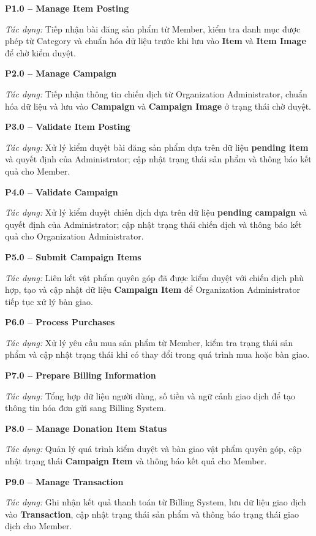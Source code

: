 \documentclass[12pt,a4paper]{report}
\begin{document}
\textbf{P1.0 -- Manage Item Posting}

\textit{Tác dụng:} Tiếp nhận bài đăng sản phẩm từ Member, kiểm tra danh mục được phép từ Category và chuẩn hóa dữ liệu trước khi lưu vào \textbf{Item} và \textbf{Item Image} để chờ kiểm duyệt.

\textbf{P2.0 -- Manage Campaign}

\textit{Tác dụng:} Tiếp nhận thông tin chiến dịch từ Organization Administrator, chuẩn hóa dữ liệu và lưu vào \textbf{Campaign} và \textbf{Campaign Image} ở trạng thái chờ duyệt.

\textbf{P3.0 -- Validate Item Posting}

\textit{Tác dụng:} Xử lý kiểm duyệt bài đăng sản phẩm dựa trên dữ liệu \textbf{pending item} và quyết định của Administrator; cập nhật trạng thái sản phẩm và thông báo kết quả cho Member.

\textbf{P4.0 -- Validate Campaign}

\textit{Tác dụng:} Xử lý kiểm duyệt chiến dịch dựa trên dữ liệu \textbf{pending campaign} và quyết định của Administrator; cập nhật trạng thái chiến dịch và thông báo kết quả cho Organization Administrator.

\textbf{P5.0 -- Submit Campaign Items}

\textit{Tác dụng:} Liên kết vật phẩm quyên góp đã được kiểm duyệt với chiến dịch phù hợp, tạo và cập nhật dữ liệu \textbf{Campaign Item} để Organization Administrator tiếp tục xử lý bàn giao.

\textbf{P6.0 -- Process Purchases}

\textit{Tác dụng:} Xử lý yêu cầu mua sản phẩm từ Member, kiểm tra trạng thái sản phẩm và cập nhật trạng thái khi có thay đổi trong quá trình mua hoặc bàn giao.

\textbf{P7.0 -- Prepare Billing Information}

\textit{Tác dụng:} Tổng hợp dữ liệu người dùng, số tiền và ngữ cảnh giao dịch để tạo thông tin hóa đơn gửi sang Billing System.

\textbf{P8.0 -- Manage Donation Item Status}

\textit{Tác dụng:} Quản lý quá trình kiểm duyệt và bàn giao vật phẩm quyên góp, cập nhật trạng thái \textbf{Campaign Item} và thông báo kết quả cho Member.

\textbf{P9.0 -- Manage Transaction}

\textit{Tác dụng:} Ghi nhận kết quả thanh toán từ Billing System, lưu dữ liệu giao dịch vào \textbf{Transaction}, cập nhật trạng thái sản phẩm và thông báo trạng thái giao dịch cho Member.
\end{document}
